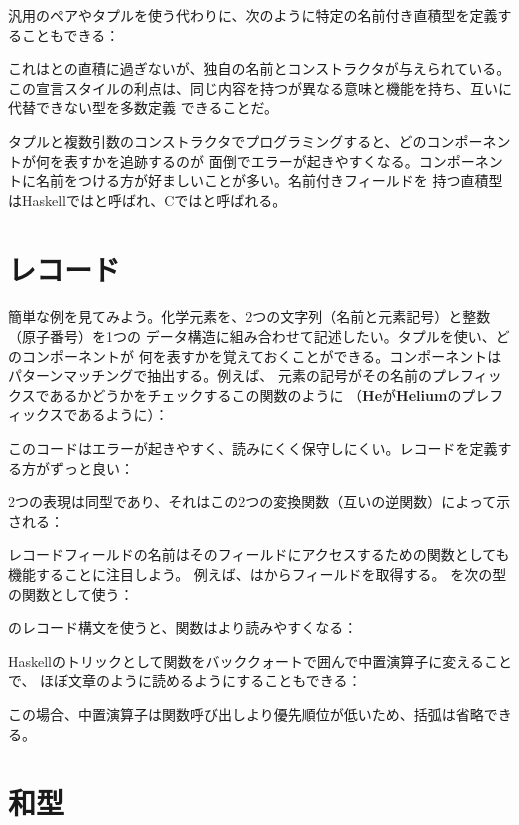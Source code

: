 汎用のペアやタプルを使う代わりに、次のように特定の名前付き直積型を定義することもできる：

これはとの直積に過ぎないが、独自の名前とコンストラクタが与えられている。
この宣言スタイルの利点は、同じ内容を持つが異なる意味と機能を持ち、互いに代替できない型を多数定義
できることだ。

タプルと複数引数のコンストラクタでプログラミングすると、どのコンポーネントが何を表すかを追跡するのが
面倒でエラーが起きやすくなる。コンポーネントに名前をつける方が好ましいことが多い。名前付きフィールドを
持つ直積型はHaskellではと呼ばれ、Cではと呼ばれる。

\section{レコード}

簡単な例を見てみよう。化学元素を、2つの文字列（名前と元素記号）と整数（原子番号）を1つの
データ構造に組み合わせて記述したい。タプルを使い、どのコンポーネントが
何を表すかを覚えておくことができる。コンポーネントはパターンマッチングで抽出する。例えば、
元素の記号がその名前のプレフィックスであるかどうかをチェックするこの関数のように
（\textbf{He}が\textbf{Helium}のプレフィックスであるように）：

このコードはエラーが起きやすく、読みにくく保守しにくい。レコードを定義する方がずっと良い：

2つの表現は同型であり、それはこの2つの変換関数（互いの逆関数）によって示される：


レコードフィールドの名前はそのフィールドにアクセスするための関数としても機能することに注目しよう。
例えば、はからフィールドを取得する。
を次の型の関数として使う：

のレコード構文を使うと、関数はより読みやすくなる：

Haskellのトリックとして関数をバッククォートで囲んで中置演算子に変えることで、
ほぼ文章のように読めるようにすることもできる：

この場合、中置演算子は関数呼び出しより優先順位が低いため、括弧は省略できる。

\section{和型}

